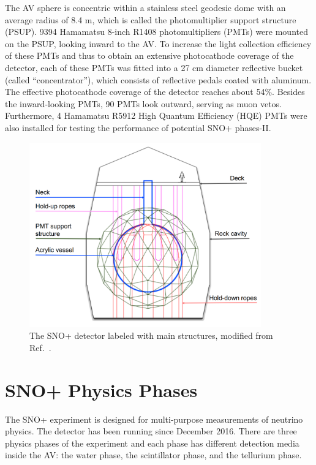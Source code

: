 The AV sphere is concentric within a stainless steel geodesic dome with an average radius of 8.4 m, which is called the photomultiplier support structure (PSUP). 9394 Hamamatsu 8-inch R1408 photomultipliers (PMTs) were mounted on the PSUP, looking inward to the AV. To increase the light collection efficiency of these PMTs and thus to obtain an extensive photocathode coverage of the detector, each of these PMTs was fitted into a 27 cm diameter reflective bucket (called ``concentrator''), which consists of reflective pedals coated with aluminum. The effective photocathode coverage of the detector reaches about 54\%\cite{whitepaper}. Besides the inward-looking PMTs, 90 PMTs look outward, serving as muon vetos. Furthermore, 4 Hamamatsu R5912 High Quantum Efficiency (HQE) PMTs were also installed for testing the performance of potential SNO+ phases-II\cite{stringer2019sensitivity}.

\begin{figure}[htbp]
	\centering
	\includegraphics[width=10cm]{SNOPdetector.png}
	\caption[The SNO+ detector labeled with main structures.]{The SNO+ detector labeled with main structures, modified from Ref.~\cite{jones2011background}.}
	\label{snopdetector}
\end{figure}

\section{SNO+ Physics Phases}\label{sect:physicsPhase}
The SNO+ experiment is designed for multi-purpose measurements of neutrino physics. The detector has been running since December 2016. There are three physics phases of the experiment and each phase has different detection media inside the AV: the water phase, the scintillator phase, and the tellurium phase\cite{whitepaper}. 

